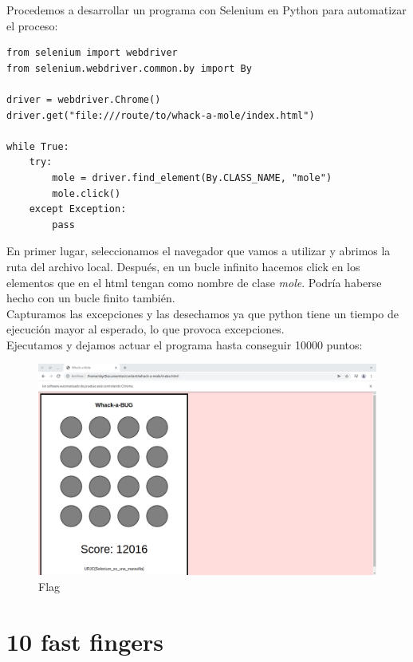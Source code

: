 \documentclass[12pt, a4paper,twoside,titlepage]{article}
\begin{document}
Procedemos a desarrollar un programa con Selenium en Python para automatizar el proceso:

\begin{verbatim}
from selenium import webdriver
from selenium.webdriver.common.by import By

driver = webdriver.Chrome()
driver.get("file:///route/to/whack-a-mole/index.html")

while True:
    try:
        mole = driver.find_element(By.CLASS_NAME, "mole")
        mole.click()
    except Exception:
        pass
\end{verbatim}

En primer lugar, seleccionamos el navegador que vamos a utilizar y abrimos la ruta del archivo local. Después, en un bucle infinito hacemos click en los elementos que en el html tengan como nombre de clase \emph{mole}. Podría haberse hecho con un bucle finito también.
\\
Capturamos las excepciones y las desechamos ya que python tiene un tiempo de ejecución mayor al esperado, lo que provoca excepciones.
\\
Ejecutamos y dejamos actuar el programa hasta conseguir 10000 puntos:

\begin{figure}[H]
    \centering
    \includegraphics[width=1\linewidth]{Figuras/WhackAMole/Solucion.png}
    \caption{Flag}
    \label{fig:my_label}
\end{figure}

\newpage

\section{10 fast fingers}
\end{document}
